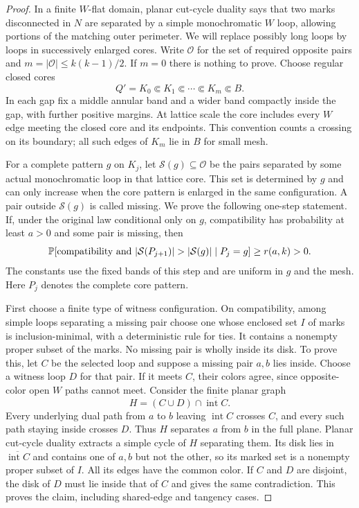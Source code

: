 \begin{proof}
In a finite $W$-flat domain, planar cut-cycle duality says that two
marks disconnected in $N$ are separated by a simple monochromatic
$W$ loop, allowing portions of the matching outer perimeter. We
will replace possibly long loops by loops in successively enlarged
cores. Write $\mathcal O$ for the set of required opposite pairs
and $m=|\mathcal O|\le k(k-1)/2$. If $m=0$ there is nothing to prove.
Choose regular closed cores
\[
       Q'=K_0\Subset K_1\Subset\cdots\Subset K_m\Subset B.
\]
In each gap fix a middle annular band and a wider band compactly
inside the gap, with further positive margins. At lattice scale
the core includes every $W$ edge meeting the closed core and its
endpoints. This convention counts a crossing on its boundary; all
such edges of $K_m$ lie in $B$ for small mesh.

For a complete pattern $g$ on $K_j$, let $\mathcal S(g)\subseteq
\mathcal O$ be the pairs separated by some actual monochromatic
loop in that lattice core. This set is determined by $g$ and can
only increase when the core pattern is enlarged in the same
configuration. A pair outside $\mathcal S(g)$ is called missing.
We prove the following one-step statement. If, under the original
law conditional only on $g$, compatibility has probability at
least $a>0$ and some pair is missing, then
\begin{equation}\label{eq:spatial-witness-step}
 \P[\text{compatibility and }|\mathcal S(P_{j+1})|
             >|\mathcal S(g)|\mid P_j=g]\ge r(a,k)>0.
\end{equation}
The constants use the fixed bands of this step and are uniform in
$g$ and the mesh. Here $P_j$ denotes the complete core pattern.

First choose a finite type of witness configuration. On compatibility,
among simple loops separating a missing pair choose one whose enclosed
set $I$ of marks is inclusion-minimal, with a deterministic rule for
ties. It contains a nonempty proper subset of the marks. No missing
pair is wholly inside its disk. To prove this, let $C$ be the selected
loop and suppose a missing pair $a,b$ lies inside. Choose a witness
loop $D$ for that pair. If it meets $C$, their colors agree, since
opposite-color open $W$ paths cannot meet. Consider the finite planar
graph
\[
             H=(C\cup D)\cap\overline{\operatorname{int}C}.
\]
Every underlying dual path from $a$ to $b$ leaving
$\operatorname{int}C$ crosses $C$, and every such path staying
inside crosses $D$. Thus $H$ separates $a$ from $b$ in the full
plane. Planar cut-cycle duality extracts a simple cycle of $H$
separating them. Its disk lies in
$\overline{\operatorname{int}C}$ and contains one of $a,b$ but not
the other, so its marked set is a nonempty proper subset of $I$.
All its edges have the common color. If $C$ and $D$ are disjoint,
the disk of $D$ must lie inside that of $C$ and gives the same
contradiction. This proves the claim, including shared-edge and
tangency cases.


\end{proof}
